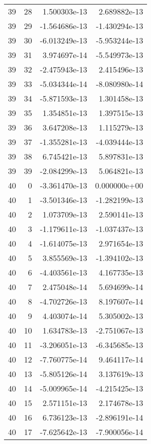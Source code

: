 \begin{tabular}{rrrr}
  39 &   28 &  1.500303e-13 &  2.689882e-13 \\
  39 &   29 & -1.564686e-13 & -1.430294e-13 \\
  39 &   30 & -6.013249e-13 & -5.953244e-13 \\
  39 &   31 &  3.974697e-14 & -5.549973e-13 \\
  39 &   32 & -2.475943e-13 &  2.415496e-13 \\
  39 &   33 & -5.034344e-14 & -8.080980e-14 \\
  39 &   34 & -5.871593e-13 &  1.301458e-13 \\
  39 &   35 &  1.354851e-13 &  1.397515e-13 \\
  39 &   36 &  3.647208e-13 &  1.115279e-13 \\
  39 &   37 & -1.355281e-13 & -4.039444e-13 \\
  39 &   38 &  6.745421e-13 &  5.897831e-13 \\
  39 &   39 & -2.084299e-13 &  5.064821e-13 \\
  40 &    0 & -3.361470e-13 &  0.000000e+00 \\
  40 &    1 & -3.501346e-13 & -1.282199e-13 \\
  40 &    2 &  1.073709e-13 &  2.590141e-13 \\
  40 &    3 & -1.179611e-13 & -1.037437e-13 \\
  40 &    4 & -1.614075e-13 &  2.971654e-13 \\
  40 &    5 &  3.855569e-13 & -1.394102e-13 \\
  40 &    6 & -4.403561e-13 &  4.167735e-13 \\
  40 &    7 &  2.475048e-14 &  5.694699e-14 \\
  40 &    8 & -4.702726e-13 &  8.197607e-14 \\
  40 &    9 &  4.403074e-14 &  5.305002e-13 \\
  40 &   10 &  1.634783e-13 & -2.751067e-13 \\
  40 &   11 & -3.206051e-13 & -6.345685e-13 \\
  40 &   12 & -7.760775e-14 &  9.464117e-14 \\
  40 &   13 & -5.805126e-14 &  3.137619e-13 \\
  40 &   14 & -5.009965e-14 & -4.215425e-13 \\
  40 &   15 &  2.571151e-13 &  2.174678e-13 \\
  40 &   16 &  6.736123e-13 & -2.896191e-14 \\
  40 &   17 & -7.625642e-13 & -7.900056e-14 \\

\end{tabular}
